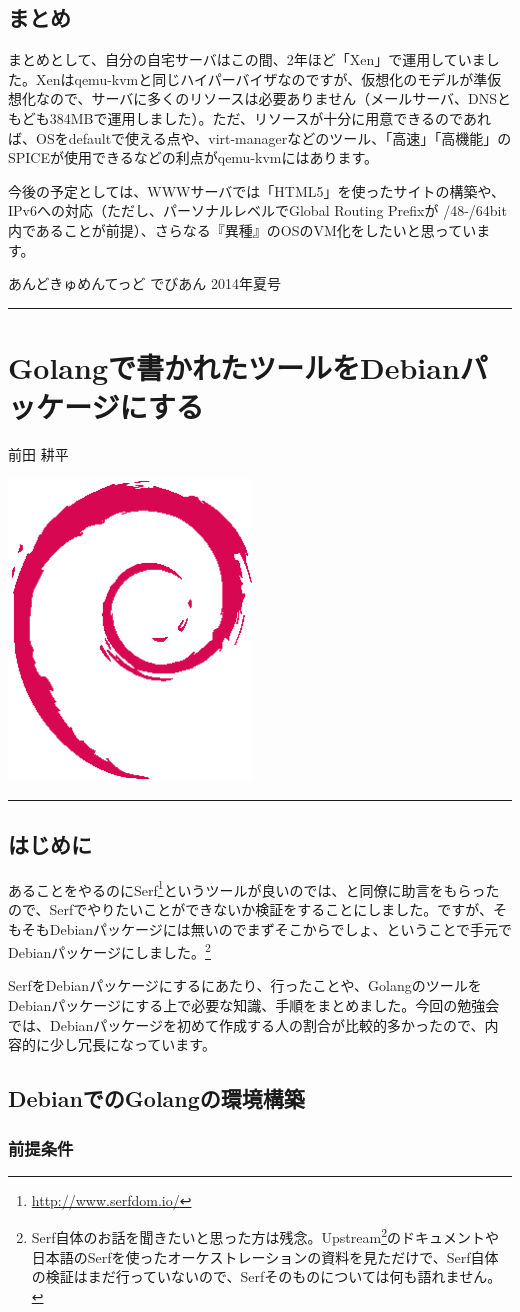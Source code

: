 \documentclass[mingoth,a4paper]{jsarticle}
\renewcommand{\dancersection}[2]{%
\newpage
あんどきゅめんてっど でびあん 2014年夏号
%
\vspace{0.1mm}\\
{\color{dancerdarkblue}\rule{\hsize}{2mm}}

%
%
\begin{minipage}[t]{0.6\hsize}
\color{dancerdarkblue}
\vspace{1cm}
\section{#1}
\hfill{}#2\\
\end{minipage}
\begin{minipage}[t]{0.4\hsize}
\vspace{-2cm}
\hfill{}\includegraphics[height=8cm]{image200502/openlogo-nd.eps}\\
\vspace{-5cm}
\end{minipage}
%
{\color{dancerlightblue}\rule{0.66\hsize}{2mm}}
%
\vspace{2cm}
}
\begin{document}
\subsection{まとめ}
まとめとして、自分の自宅サーバはこの間、2年ほど「Xen」で運用していました。Xenはqemu-kvmと同じハイパーバイザなのですが、仮想化のモデルが準仮想化なので、サーバに多くのリソースは必要ありません（メールサーバ、DNSともども384MBで運用しました）。ただ、リソースが十分に用意できるのであれば、OSをdefaultで使える点や、virt-managerなどのツール、「高速」「高機能」のSPICEが使用できるなどの利点がqemu-kvmにはあります。

今後の予定としては、WWWサーバでは「HTML5」を使ったサイトの構築や、IPv6への対応（ただし、パーソナルレベルでGlobal Routing Prefixが /48-/64bit内であることが前提）、さらなる『異種』のOSのVM化をしたいと思っています。

\dancersection{Golangで書かれたツールをDebianパッケージにする}{前田 耕平}

\subsection{はじめに}

あることをやるのにSerf\footnote{\url{http://www.serfdom.io/}}というツールが良いのでは、と同僚に助言をもらったので、Serfでやりたいことができないか検証をすることにしました。ですが、そもそもDebianパッケージには無いのでまずそこからでしょ、ということで手元でDebianパッケージにしました。\footnote{Serf自体のお話を聞きたいと思った方は残念。Upstream\footnote{\url{https://github.com/hashicorp/serf/}}のドキュメントや日本語のSerfを使ったオーケストレーションの資料を見ただけで、Serf自体の検証はまだ行っていないので、Serfそのものについては何も語れません。}

SerfをDebianパッケージにするにあたり、行ったことや、GolangのツールをDebianパッケージにする上で必要な知識、手順をまとめました。今回の勉強会では、Debianパッケージを初めて作成する人の割合が比較的多かったので、内容的に少し冗長になっています。

\subsection{DebianでのGolangの環境構築}

\subsubsection{前提条件}
\end{document}
